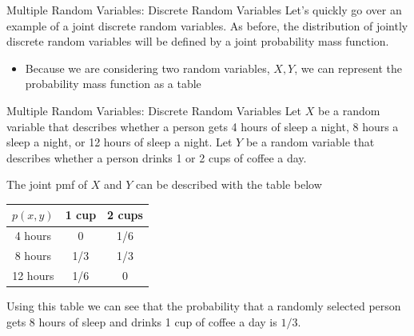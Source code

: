 \documentclass[notheorems,9pt]{beamer}
\begin{document}
\begin{frame}{Multiple Random Variables: Discrete Random Variables} 
	\label{frame:mrv-intro3}
	Let's quickly go over an example of a joint discrete random variables. As before, the distribution of jointly discrete random variables will be defined by a joint probability mass function. 
	\onslide<2->
	\begin{itemize}
		\item Because we are considering two random variables, \(X,Y\), we can represent the probability mass function as a table
	\end{itemize}
\end{frame}
\begin{frame}{Multiple Random Variables: Discrete Random Variables} 
	\label{frame:mrv-intro4}
	Let \(X\) be a random variable that describes whether a person gets 4 hours of sleep a night, 8 hours a sleep a night, or 12 hours of sleep a night. Let \(Y\) be a random variable that describes whether a person drinks 1 or 2 cups of coffee a day. 

	The joint pmf of \(X\) and \(Y\) can be described with the table below
	\begin{table}[htpb]
		\centering
		\begin{tabular}{c|cc}
			\(p(x,y)\) & 1 cup  & 2 cups\\
			\hline
			4 hours & 0 & 1/6 \\
			8 hours & 1/3 & 1/3 \\
			12 hours & 1/6 & 0
		\end{tabular}
	\end{table}
	Using this table we can see that the probability that a randomly selected person gets 8 hours of sleep and drinks 1 cup of coffee a day is \(1/3\).

\end{frame}
\end{document}
